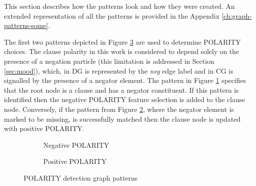     This section describes how the patterns look and how they were created. An extended representation of all the patterns is provided in the Appendix \ref{ch:graph-patterns-some}.

    The first two patterns depicted in Figure \ref{fig:polarity-pattern7} are used to determine POLARITY choices. The clause polarity in this work is considered to depend solely on the presence of a negation particle (this limitation is addressed in Section \ref{sec:mood}), which, in DG is represented by the \textit{neg} edge label and in CG is signalled by the presence of a negator element. The pattern in Figure \ref{fig:neg-pattern5} specifies that the root node is a clause and has a negator constituent. If this pattern is identified then the negative POLARITY feature selection is added to the clause node. Conversely, if the pattern from Figure \ref{fig:neg-pattern6}, where the negator element is marked to be missing, is successfully matched then the clause node is updated with positive POLARITY.

    \begin{figure}[!ht]
        \centering
        \begin{subfigure}[t]{0.47\textwidth}
            \centering
            \caption{Negative POLARITY}
            \label{fig:neg-pattern5}
        \end{subfigure}
        \begin{subfigure}[t]{0.47\textwidth}
            \centering
            \caption{Positive POLARITY}
            \label{fig:neg-pattern6}
        \end{subfigure}
        \caption{POLARITY detection graph patterns}
        \label{fig:polarity-pattern7}
        \end{figure}

